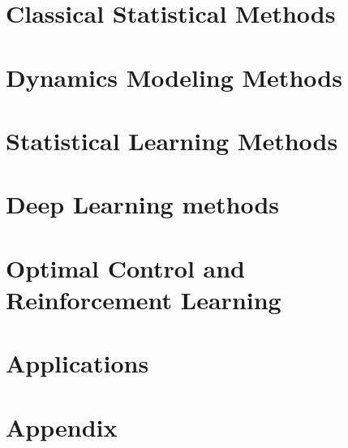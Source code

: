 \documentclass[oneside,hidelinks,12pt,letterpaper]{scrbook} %
\theoremstyle{remark}
\theoremstyle{coloredRemark}
\theoremstyle{coloredNote}
\begin{document}



\startcontents[chapters]
\part{Classical Statistical Methods}





\startcontents[chapters]
\part{Dynamics Modeling Methods}







\startcontents[chapters]
\part{Statistical Learning Methods}




\startcontents[chapters]
\part{Deep Learning methods}



\startcontents[chapters]	
\part{Optimal Control and Reinforcement Learning}



\startcontents[chapters]	
\part{Applications}




%

\startcontents[chapters]
\part{Appendix}
\appendix







\printindex
\end{document}
